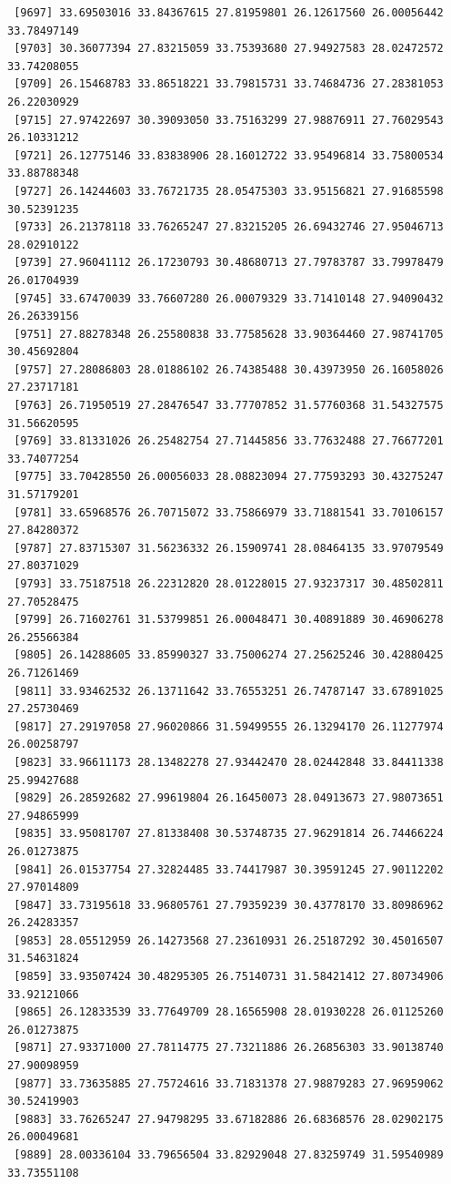 \documentclass[
  letterpaper,
  DIV=11,
  numbers=noendperiod]{scrartcl}
\begin{document}
\begin{verbatim}
 [9697] 33.69503016 33.84367615 27.81959801 26.12617560 26.00056442 33.78497149
 [9703] 30.36077394 27.83215059 33.75393680 27.94927583 28.02472572 33.74208055
 [9709] 26.15468783 33.86518221 33.79815731 33.74684736 27.28381053 26.22030929
 [9715] 27.97422697 30.39093050 33.75163299 27.98876911 27.76029543 26.10331212
 [9721] 26.12775146 33.83838906 28.16012722 33.95496814 33.75800534 33.88788348
 [9727] 26.14244603 33.76721735 28.05475303 33.95156821 27.91685598 30.52391235
 [9733] 26.21378118 33.76265247 27.83215205 26.69432746 27.95046713 28.02910122
 [9739] 27.96041112 26.17230793 30.48680713 27.79783787 33.79978479 26.01704939
 [9745] 33.67470039 33.76607280 26.00079329 33.71410148 27.94090432 26.26339156
 [9751] 27.88278348 26.25580838 33.77585628 33.90364460 27.98741705 30.45692804
 [9757] 27.28086803 28.01886102 26.74385488 30.43973950 26.16058026 27.23717181
 [9763] 26.71950519 27.28476547 33.77707852 31.57760368 31.54327575 31.56620595
 [9769] 33.81331026 26.25482754 27.71445856 33.77632488 27.76677201 33.74077254
 [9775] 33.70428550 26.00056033 28.08823094 27.77593293 30.43275247 31.57179201
 [9781] 33.65968576 26.70715072 33.75866979 33.71881541 33.70106157 27.84280372
 [9787] 27.83715307 31.56236332 26.15909741 28.08464135 33.97079549 27.80371029
 [9793] 33.75187518 26.22312820 28.01228015 27.93237317 30.48502811 27.70528475
 [9799] 26.71602761 31.53799851 26.00048471 30.40891889 30.46906278 26.25566384
 [9805] 26.14288605 33.85990327 33.75006274 27.25625246 30.42880425 26.71261469
 [9811] 33.93462532 26.13711642 33.76553251 26.74787147 33.67891025 27.25730469
 [9817] 27.29197058 27.96020866 31.59499555 26.13294170 26.11277974 26.00258797
 [9823] 33.96611173 28.13482278 27.93442470 28.02442848 33.84411338 25.99427688
 [9829] 26.28592682 27.99619804 26.16450073 28.04913673 27.98073651 27.94865999
 [9835] 33.95081707 27.81338408 30.53748735 27.96291814 26.74466224 26.01273875
 [9841] 26.01537754 27.32824485 33.74417987 30.39591245 27.90112202 27.97014809
 [9847] 33.73195618 33.96805761 27.79359239 30.43778170 33.80986962 26.24283357
 [9853] 28.05512959 26.14273568 27.23610931 26.25187292 30.45016507 31.54631824
 [9859] 33.93507424 30.48295305 26.75140731 31.58421412 27.80734906 33.92121066
 [9865] 26.12833539 33.77649709 28.16565908 28.01930228 26.01125260 26.01273875
 [9871] 27.93371000 27.78114775 27.73211886 26.26856303 33.90138740 27.90098959
 [9877] 33.73635885 27.75724616 33.71831378 27.98879283 27.96959062 30.52419903
 [9883] 33.76265247 27.94798295 33.67182886 26.68368576 28.02902175 26.00049681
 [9889] 28.00336104 33.79656504 33.82929048 27.83259749 31.59540989 33.73551108

\end{verbatim}
\end{document}

